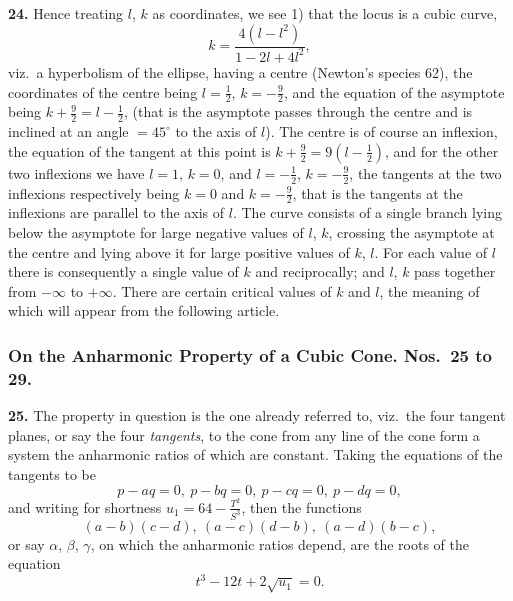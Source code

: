 \documentclass[11pt,a4paper]{article}
\theoremstyle{plain}
\begin{document}
\noindent\textbf{24.} Hence treating $l$, $k$ as coordinates, we see 1) that the locus is a cubic curve,
\[
k = \frac{4(l-l^2)}{1-2l+4l^2},
\]
viz.\ a hyperbolism of the ellipse, having a centre (Newton's species 62), the coordinates of the centre being $l=\tfrac{1}{2}$, $k=-\tfrac{9}{2}$, and the equation of the asymptote being $k+\tfrac{9}{2} = l-\tfrac{1}{2}$, (that is the asymptote passes through the centre and is inclined at an angle $=45^{\circ}$ to the axis of $l$). The centre is of course an inflexion, the equation of the tangent at this point is $k+\tfrac{9}{2} = 9(l-\tfrac{1}{2})$, and for the other two inflexions we have $l=1$, $k=0$, and $l=-\tfrac{1}{2}$, $k=-\tfrac{9}{2}$, the tangents at the two inflexions respectively being $k=0$ and $k=-\tfrac{9}{2}$, that is the tangents at the inflexions are parallel to the axis of $l$. The curve consists of a single branch lying below the asymptote for large negative values of $l$, $k$, crossing the asymptote at the centre and lying above it for large positive values of $k$, $l$. For each value of $l$ there is consequently a single value of $k$ and reciprocally; and $l$, $k$ pass together from $-\infty$ to $+\infty$. There are certain critical values of $k$ and $l$, the meaning of which will appear from the following article.

\subsubsection*{On the Anharmonic Property of a Cubic Cone. Nos.\ 25 to 29.}

\noindent\textbf{25.} The property in question is the one already referred to, viz.\ the four tangent planes, or say the four \textit{tangents}, to the cone from any line of the cone form a system the anharmonic ratios of which are constant. Taking the equations of the tangents to be
\[
p - aq = 0, \ p - bq = 0, \ p - cq = 0, \ p - dq = 0,
\]
and writing for shortness $u_1 = 64 - \tfrac{T^2}{S^3}$, then the functions
\[
(a-b)(c-d), \ (a-c)(d-b), \ (a-d)(b-c),
\]
or say $\alpha$, $\beta$, $\gamma$, on which the anharmonic ratios depend, are the roots of the equation
\[
t^3 - 12t + 2\sqrt{u_1} = 0.
\]
\end{document}
